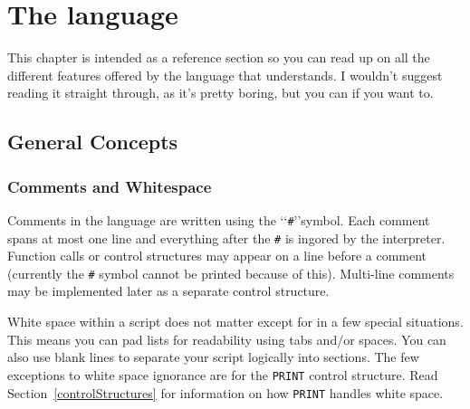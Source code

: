 
\chapter{The language}
\label{language}

\newcommand{\breakline}{\vspace{3mm}\centerline{\rule{12cm}{1pt}}\vspace{0mm}}
\newcommand{\langExample}[2]{Example: &\texttt{#1}\\Stack Result: &\texttt{#2}}
\newcommand{\rollExample}[3]{<list:#1 values:#2 $\le$ n $\le$ #3>}
\newcommand{\listExample}[2]{<list:#1 values:(#2)>}
\newcommand{\numExample}[2]{<number:#1 $\le$ n $\le$ #2>}
\newcommand{\constraint}[1]{\textbf{Constraint:} \texttt{#1}}
\newcommand{\bl}{\\\\}
\newcommand{\ostack}{<old stack> }

This chapter is intended as a reference section so you can read up on all the
different features offered by the language that \progLogo understands. I
wouldn't suggest reading it straight through, as it's pretty boring, but you
can if you want to.

\section{General Concepts}
\label{languageConcepts}

\subsection{Comments and Whitespace}
\label{comments}
Comments in the language are written using the \lq\lq\texttt{\#}\rq\rq symbol.
Each comment spans at most one line and everything after the \texttt{\#} is
ingored by the interpreter. Function calls or control structures may
appear on a line before a comment (currently the \texttt{\#} symbol cannot be
printed because of this). Multi-line comments may be implemented later as
a separate control structure.

White space within a script does not matter except for in a few special
situations. This means you can pad lists for readability using tabs and/or spaces.
You can also use blank lines to separate your script logically into sections.
The few exceptions to white space ignorance are for the \texttt{PRINT} control
structure. Read Section~\ref{controlStructures} for information on how
\texttt{PRINT} handles white space.

